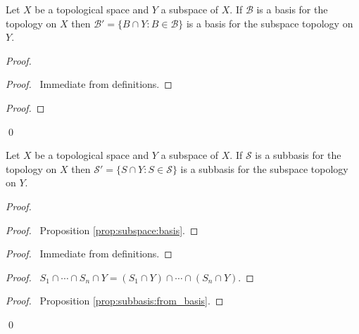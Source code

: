 \begin{prop}
  \label{prop:subspace:basis}
  Let $X$ be a topological space and $Y$ a subspace of $X$. If $\mathcal{B}$ is a basis for the topology on $X$ then $\mathcal{B}' = \{ B \cap Y : B \in \mathcal{B} \}$ is a basis for the subspace topology on $Y$.
\end{prop}

\begin{proof}
  \pf
  \begin{proof}
    \pf\ Immediate from definitions.
  \end{proof}
  \begin{proof}
  \end{proof}
  \qed
\end{proof}

\begin{prop}
  \label{prop:subspace:subbasis}
  Let $X$ be a topological space and $Y$ a subspace of $X$. If $\mathcal{S}$ is a subbasis for the topology on $X$ then $\mathcal{S}' = \{ S \cap Y : S \in \mathcal{S} \}$ is a subbasis for the subspace topology on $Y$.
\end{prop}

\begin{proof}
  \pf
  \begin{proof}
    \pf\ Proposition \ref{prop:subspace:basis}.
  \end{proof}
  \begin{proof}
    \pf\ Immediate from definitions.
  \end{proof}
  \begin{proof}
    \pf\ $S_1 \cap \cdots \cap S_n \cap Y = (S_1 \cap Y) \cap \cdots \cap (S_n \cap Y)$.
  \end{proof}
  \qedstep
  \begin{proof}
    \pf\ Proposition \ref{prop:subbasis:from_basis}.
  \end{proof}
  \qed
\end{proof}

